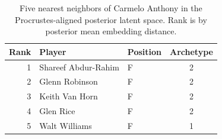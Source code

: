 \begin{table}[htbp]
  \centering\small
  \begin{tabular}{rllc}
    \toprule
    Rank & Player & Position & Archetype \\
    \midrule
    1 & Shareef Abdur-Rahim & F & 2 \\
    2 & Glenn Robinson & F & 2 \\
    3 & Keith Van Horn & F & 2 \\
    4 & Glen Rice & F & 2 \\
    5 & Walt Williams & F & 1 \\
    \bottomrule
  \end{tabular}
  \caption{Five nearest neighbors of Carmelo Anthony in the Procrustes-aligned posterior latent space. Rank is by posterior mean embedding distance.}
  \label{tab:Carmelo_Anthony_neighbors}
\end{table}

